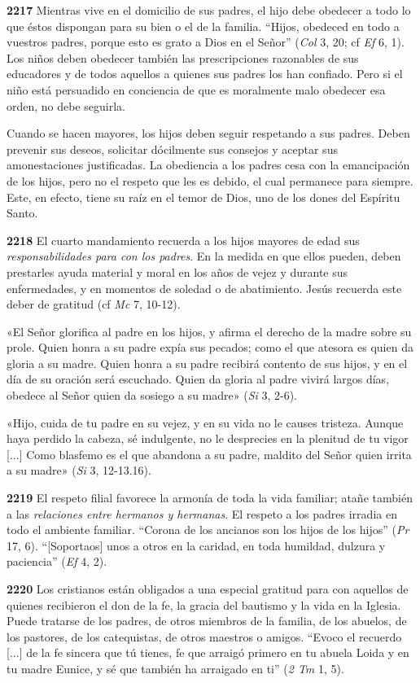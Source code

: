 \documentclass[]{article}
\begin{document}
\textbf{2217} Mientras vive en el domicilio de sus padres, el hijo debe
obedecer a todo lo que éstos dispongan para su bien o el de la familia.
``Hijos, obedeced en todo a vuestros padres, porque esto es grato a Dios
en el Señor'' (\emph{Col} 3, 20; cf \emph{Ef} 6, 1). Los niños deben
obedecer también las prescripciones razonables de sus educadores y de
todos aquellos a quienes sus padres los han confiado. Pero si el niño
está persuadido en conciencia de que es moralmente malo obedecer esa
orden, no debe seguirla.

Cuando se hacen mayores, los hijos deben seguir respetando a sus padres.
Deben prevenir sus deseos, solicitar dócilmente sus consejos y aceptar
sus amonestaciones justificadas. La obediencia a los padres cesa con la
emancipación de los hijos, pero no el respeto que les es debido, el cual
permanece para siempre. Este, en efecto, tiene su raíz en el temor de
Dios, uno de los dones del Espíritu Santo.

\textbf{2218} El cuarto mandamiento recuerda a los hijos mayores de edad
sus \emph{responsabilidades para con los padres}. En la medida en que
ellos pueden, deben prestarles ayuda material y moral en los años de
vejez y durante sus enfermedades, y en momentos de soledad o de
abatimiento. Jesús recuerda este deber de gratitud (cf \emph{Mc} 7,
10-12).

«El Señor glorifica al padre en los hijos, y afirma el derecho de la
madre sobre su prole. Quien honra a su padre expía sus pecados; como el
que atesora es quien da gloria a su madre. Quien honra a su padre
recibirá contento de sus hijos, y en el día de su oración será
escuchado. Quien da gloria al padre vivirá largos días, obedece al Señor
quien da sosiego a su madre» (\emph{Si} 3, 2-6).

«Hijo, cuida de tu padre en su vejez, y en su vida no le causes
tristeza. Aunque haya perdido la cabeza, sé indulgente, no le desprecies
en la plenitud de tu vigor {[}...{]} Como blasfemo es el que abandona a
su padre, maldito del Señor quien irrita a su madre» (\emph{Si} 3,
12-13.16).

\textbf{2219} El respeto filial favorece la armonía de toda la vida
familiar; atañe también a las \emph{relaciones entre hermanos y
hermanas}. El respeto a los padres irradia en todo el ambiente familiar.
``Corona de los ancianos son los hijos de los hijos'' (\emph{Pr} 17, 6).
``{[}Soportaos{]} unos a otros en la caridad, en toda humildad, dulzura
y paciencia'' (\emph{Ef} 4, 2).

\textbf{2220} Los cristianos están obligados a una especial gratitud
para con aquellos de quienes recibieron el don de la fe, la gracia del
bautismo y la vida en la Iglesia. Puede tratarse de los padres, de otros
miembros de la familia, de los abuelos, de los pastores, de los
catequistas, de otros maestros o amigos. ``Evoco el recuerdo {[}...{]}
de la fe sincera que tú tienes, fe que arraigó primero en tu abuela
Loida y en tu madre Eunice, y sé que también ha arraigado en ti''
(\emph{2 Tm} 1, 5).
\end{document}
